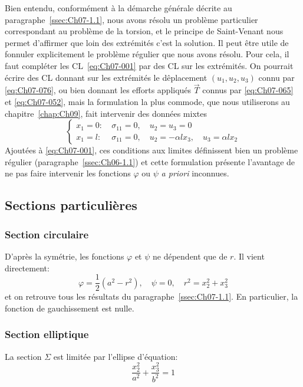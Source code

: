 Bien entendu, conformément à la démarche générale décrite au paragraphe~\ref{ssec:Ch07-1.1}, nous avons résolu un problème particulier correspondant au problème de la torsion, et le principe de Saint-Venant nous permet d'affirmer que loin des extrémités c'est la solution.
Il peut être utile de fonnuler explicitement le problème régulier que nous avons résolu.
Pour cela, il faut compléter les CL~\eqref{eq:Ch07-001} par des CL sur les extrémités.
On pourrait écrire des CL donnant sur les extrémités le dêplacement $(u_1, u_2, u_3)$ connu par \eqref{eq:Ch07-076}, ou bien donnant les efforts appliqués $\vec{T}$ connus par \eqref{eq:Ch07-065} et \eqref{eq:Ch07-052}, mais la formulation la plus commode, que nous utiliserons au chapitre~\ref{chap:Ch09}, fait intervenir des données mixtes
\begin{equation}
    \left\{
    \begin{aligned}
        x_1 = 0 : &\ \sigma_{11} = 0, \quad u_2 = u_3 = 0 \\
        x_1 = l : &\ \sigma_{11} = 0, \quad u_2 = -\alpha l x_3,\quad u_3 = \alpha l x_2
    \end{aligned}
    \right.
    \label{eq:Ch07-079} 
\end{equation}
Ajoutées à \eqref{eq:Ch07-001}, ces conditions aux limites définissent bien un problème régulier (paragraphe~\ref{ssec:Ch06-1.1}) et cette formulation présente l'avantage de ne pas faire intervenir les fonctions $\varphi$ ou $\psi$ \textit{a priori} inconnues. 

\subsection{Sections particulières} \label{ssec:Ch07-2.4}
\subsubsection{Section circulaire}
D'après la symétrie, les fonctions $\varphi$ et $\psi$ ne dépendent que de $r$.
Il vient directement: 
\begin{equation}
    \varphi =\frac{1}{2}\left( a^2 - r^2 \right), \quad \psi = 0, \quad r^2 = x_2^2 + x_3^2 
    \label{eq:Ch07-080}
\end{equation}
et on retrouve tous les résultats du paragraphe~\ref{ssec:Ch07-1.1}.
En particulier, la fonction de gauchissement est nulle.
\subsubsection{Section elliptique}
La section $\Sigma$ est limitée par l'ellipse d'équation:
    \begin{equation}
        \frac{x_2^2}{a^2} + \frac{x_3^2}{b^2} = 1
        \label{eq:Ch07-081}
    \end{equation}

